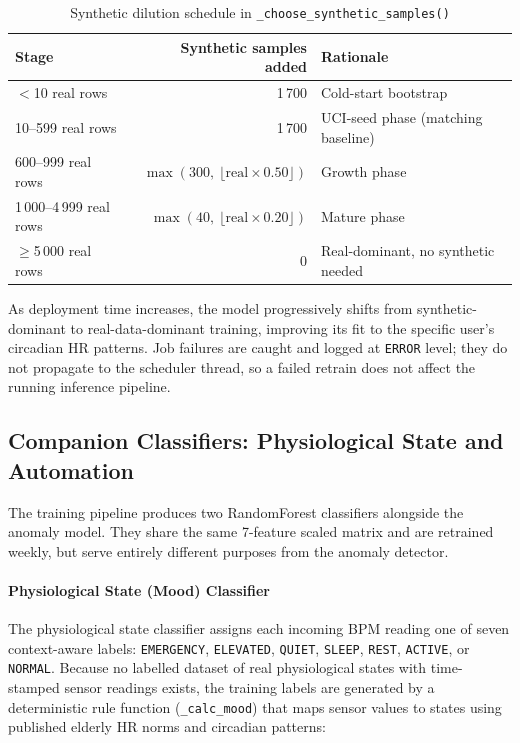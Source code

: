 \begin{table}[H]
\centering
\caption[Synthetic dilution schedule]{Synthetic dilution schedule in \texttt{\_choose\_synthetic\_samples()}}
\label{tab:dilution}
\small
\begin{tabular}{@{} l r l @{}}
\toprule
\textbf{Stage} & \textbf{Synthetic samples added} & \textbf{Rationale} \\
\midrule
$<$10 real rows       & 1\,700 & Cold-start bootstrap \\
10--599 real rows     & 1\,700 & UCI-seed phase (matching baseline) \\
600--999 real rows    & $\max(300,\ \lfloor\text{real}{\times}0.50\rfloor)$ & Growth phase \\
1\,000--4\,999 real rows & $\max(40,\ \lfloor\text{real}{\times}0.20\rfloor)$ & Mature phase \\
$\geq$5\,000 real rows   & 0 & Real-dominant, no synthetic needed \\
\bottomrule
\end{tabular}
\end{table}

As deployment time increases, the model progressively shifts from
synthetic-dominant to real-data-dominant training, improving its fit
to the specific user's circadian HR patterns.
Job failures are caught and logged at \texttt{ERROR} level; they do not
propagate to the scheduler thread, so a failed retrain does not affect
the running inference pipeline.

\subsection{Companion Classifiers: Physiological State and Automation}
\label{sec:companion_classifiers}

The training pipeline produces two RandomForest classifiers alongside the
anomaly model.  They share the same 7-feature scaled matrix and are retrained
weekly, but serve entirely different purposes from the anomaly detector.

\paragraph{Physiological State (Mood) Classifier}

The physiological state classifier assigns each incoming BPM reading one of
seven context-aware labels: \texttt{EMERGENCY}, \texttt{ELEVATED},
\texttt{QUIET}, \texttt{SLEEP}, \texttt{REST}, \texttt{ACTIVE}, or
\texttt{NORMAL}.  Because no labelled dataset of real physiological states
with time-stamped sensor readings exists, the training labels are generated
by a deterministic rule function (\texttt{\_calc\_mood}) that maps sensor
values to states using published elderly HR norms and circadian patterns:

